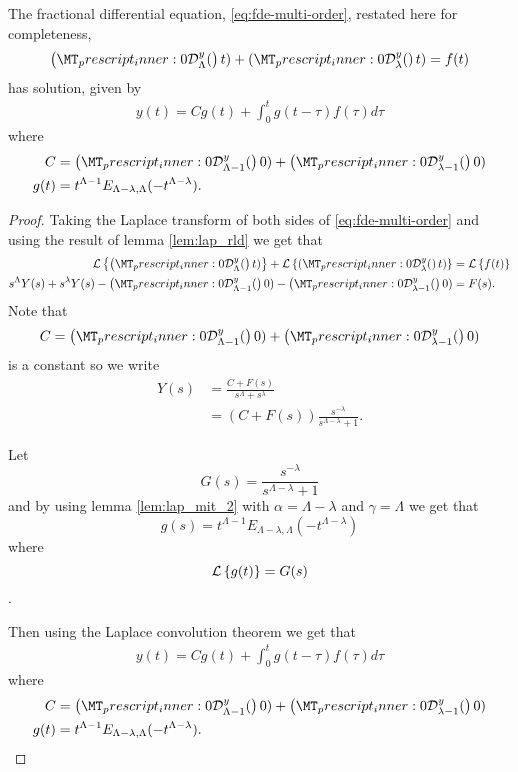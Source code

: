 \begin{lemma}
	The fractional differential equation, \ref{eq:fde-multi-order}, restated here for completeness,
	\begin{align*}
		\rld{0}{\Lambda}{y}(t) + \rld{0}{\lambda}{y}(t) = f(t)
	\end{align*}
	has solution, given by
	\begin{align*}
		y(t) = C g(t) + \int_0^t g(t-\tau)f(\tau) d\tau
	\end{align*}
	where
	\begin{align*}
		C &= \rld{0}{\Lambda-1}{y}(0) + \rld{0}{\lambda-1}{y}(0) \\
		g(t) &= t^{\Lambda - 1} E_{\Lambda - \lambda, \Lambda}(-t^{\Lambda - \lambda}).
	\end{align*}
\end{lemma}

\begin{proof}

	Taking the Laplace transform of both sides of \ref{eq:fde-multi-order} and using the result of lemma \ref{lem:lap_rld}
	we get that 
	\begin{align*}
		\laplace{\rld{0}{\Lambda}{y}(t)} + \laplace{\rld{0}{\lambda}{y}(t)} &= \laplace{f(t)} \\
		s^\Lambda Y(s) + s^\lambda Y(s) - \rld{0}{\Lambda-1}{y}(0) - \rld{0}{\lambda-1}{y}(0) &= F(s).
	\end{align*}
	Note that $$ C = \rld{0}{\Lambda-1}{y}(0) + \rld{0}{\lambda-1}{y}(0) $$ is a constant so we write
	\begin{align*}
		Y(s) &= \frac{C + F(s)}{s^\Lambda + s^\lambda} \\
			&= \left( C + F(s)\right) \frac{s^{-\lambda}}{s^{\Lambda-\lambda} + 1}.
	\end{align*}
	
	Let $$ G(s) = \frac{s^{-\lambda}}{s^{\Lambda-\lambda} + 1} $$
	and by using lemma \ref{lem:lap_mit_2} with $ \alpha = \Lambda - \lambda $ and $ \gamma = \Lambda $
	we get that $$ g(s) = t^{\Lambda  -1}E_{\Lambda - \lambda, \Lambda}(-t^{\Lambda - \lambda}) $$ where 
	$$ \mathcal{L} \left\{ g(t) \right\} = G(s) $$.
	
	Then using the Laplace convolution theorem we get that 
	\begin{align*}
		y(t) = C g(t) + \int_0^t g(t-\tau)f(\tau) d\tau
	\end{align*}
	where
	\begin{align*}
		C &= \rld{0}{\Lambda-1}{y}(0) + \rld{0}{\lambda-1}{y}(0) \\
		g(t) &= t^{\Lambda - 1} E_{\Lambda - \lambda, \Lambda}(-t^{\Lambda - \lambda}).
	\end{align*}
\end{proof}

